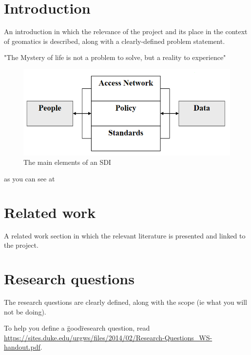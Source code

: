 \section{Introduction}
An introduction in which the relevance of the project and its place in the context of geomatics is described, along with a clearly-defined problem statement.

"The Mystery of life is not a problem to solve, but a reality to experience"\cite{einstein}


\begin{figure}
    \centering
    \includegraphics[width=12cm]{images/test.png}
    \caption{The main elements of an SDI}
    \label{thingie}
\end{figure}

as you can see at  


\section{Related work}
A related work section in which the relevant literature is presented and linked to the project.


\section{Research questions}
The research questions are clearly defined, along with the scope (ie what you will not be doing).

To help you define a \"good\" research question, 
read \url{https://sites.duke.edu/urgws/files/2014/02/Research-Questions_WS-handout.pdf}.


